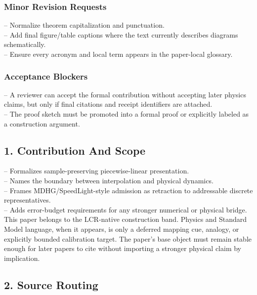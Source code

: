 \documentclass[11pt]{article}
\begin{document}
\subsubsection*{Minor Revision Requests}

\noindent{}-- Normalize theorem capitalization and punctuation.\\
\noindent{}-- Add final figure/table captions where the text currently describes diagrams schematically.\\
\noindent{}-- Ensure every acronym and local term appears in the paper-local glossary.\\

\subsubsection*{Acceptance Blockers}

\noindent{}-- A reviewer can accept the formal contribution without accepting later physics claims, but only if final citations and receipt identifiers are attached.\\
\noindent{}-- The proof sketch must be promoted into a formal proof or explicitly labeled as a construction argument.\\


\subsection*{1. Contribution And Scope}

\noindent{}-- Formalizes sample-preserving piecewise-linear presentation.\\
\noindent{}-- Names the boundary between interpolation and physical dynamics.\\
\noindent{}-- Frames MDHG/SpeedLight-style admission as retraction to addressable discrete representatives.\\
\noindent{}-- Adds error-budget requirements for any stronger numerical or physical bridge.\\

This paper belongs to the LCR-native construction band. Physics and Standard Model language, when it appears, is only a deferred mapping cue, analogy, or explicitly bounded calibration target. The paper's base object must remain stable enough for later papers to cite without importing a stronger physical claim by implication.

\subsection*{2. Source Routing}
\end{document}

